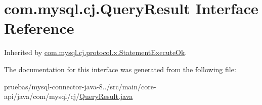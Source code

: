 \hypertarget{interfacecom_1_1mysql_1_1cj_1_1_query_result}{}\section{com.\+mysql.\+cj.\+Query\+Result Interface Reference}
\label{interfacecom_1_1mysql_1_1cj_1_1_query_result}


Inherited by \mbox{\hyperlink{classcom_1_1mysql_1_1cj_1_1protocol_1_1x_1_1_statement_execute_ok}{com.\+mysql.\+cj.\+protocol.\+x.\+Statement\+Execute\+Ok}}.



The documentation for this interface was generated from the following file\+:\begin{DoxyCompactItemize}
\item 
pruebas/mysql-\/connector-\/java-\/8../src/main/core-\/api/java/com/mysql/cj/\mbox{\hyperlink{_query_result_8java}{Query\+Result.\+java}}\end{DoxyCompactItemize}
